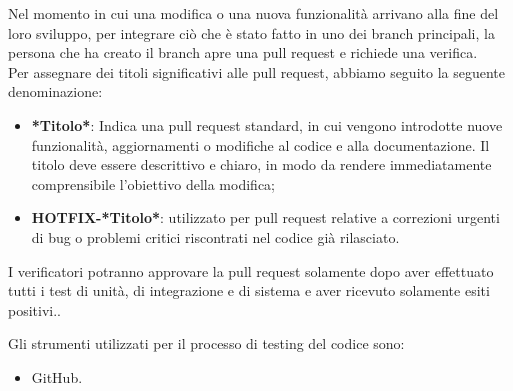 Nel momento in cui una modifica o una nuova funzionalità arrivano alla fine del loro sviluppo, per integrare ciò che è stato fatto in uno dei branch principali, la persona che ha creato il branch apre una pull request e richiede una verifica. \\
Per assegnare dei titoli significativi alle pull request, abbiamo seguito la seguente denominazione:
\begin{itemize}
    \item \textbf{*Titolo*}: Indica una pull request standard, in cui vengono introdotte nuove funzionalità, aggiornamenti o modifiche al codice e alla documentazione. Il titolo deve essere descrittivo e chiaro, in modo da rendere immediatamente comprensibile l'obiettivo della modifica;
    \item \textbf{HOTFIX-*Titolo*}: utilizzato per pull request relative a correzioni urgenti di bug o problemi critici riscontrati nel codice già rilasciato.
\end{itemize}
I verificatori potranno approvare la pull request solamente dopo aver effettuato tutti i test di unità, di integrazione e di sistema e aver ricevuto solamente esiti positivi..

Gli strumenti utilizzati per il processo di testing del codice sono:
\begin{itemize}
    \item GitHub.
\end{itemize}